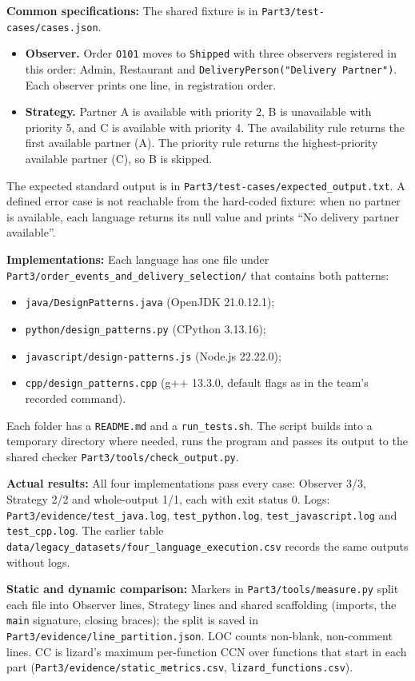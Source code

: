 \documentclass[11pt,a4paper]{article}
\newcommand{\entry}[1]{\par\textbf{#1:} }
\newcommand{\code}[1]{\nolinkurl{#1}}
\begin{document}
\entry{Common specifications}The shared fixture is in \code{Part3/test-cases/cases.json}.
\begin{itemize}
\item \textbf{Observer.} Order \code{O101} moves to \code{Shipped} with three observers registered in this order: Admin, Restaurant and \code{DeliveryPerson("Delivery Partner")}. Each observer prints one line, in registration order.
\item \textbf{Strategy.} Partner A is available with priority 2, B is unavailable with priority 5, and C is available with priority 4. The availability rule returns the first available partner (A). The priority rule returns the highest-priority available partner (C), so B is skipped.
\end{itemize}
The expected standard output is in \code{Part3/test-cases/expected_output.txt}. A defined error case is not reachable from the hard-coded fixture: when no partner is available, each language returns its null value and prints ``No delivery partner available''.

\entry{Implementations}Each language has one file under \code{Part3/order_events_and_delivery_selection/} that contains both patterns:
\begin{itemize}
\item \code{java/DesignPatterns.java} (OpenJDK 21.0.12.1);
\item \code{python/design_patterns.py} (CPython 3.13.16);
\item \code{javascript/design-patterns.js} (Node.js 22.22.0);
\item \code{cpp/design_patterns.cpp} (g++ 13.3.0, default flags as in the team's recorded command).
\end{itemize}
Each folder has a \code{README.md} and a \code{run_tests.sh}. The script builds into a temporary directory where needed, runs the program and passes its output to the shared checker \code{Part3/tools/check_output.py}.

\entry{Actual results}All four implementations pass every case: Observer 3/3, Strategy 2/2 and whole-output 1/1, each with exit status 0. Logs: \code{Part3/evidence/test_java.log}, \code{test_python.log}, \code{test_javascript.log} and \code{test_cpp.log}. The earlier table \code{data/legacy_datasets/four_language_execution.csv} records the same outputs without logs.

\entry{Static and dynamic comparison}Markers in \code{Part3/tools/measure.py} split each file into Observer lines, Strategy lines and shared scaffolding (imports, the \code{main} signature, closing braces); the split is saved in \code{Part3/evidence/line_partition.json}. LOC counts non-blank, non-comment lines. CC is lizard's maximum per-function CCN over functions that start in each part (\code{Part3/evidence/static_metrics.csv}, \code{lizard_functions.csv}).
\end{document}
